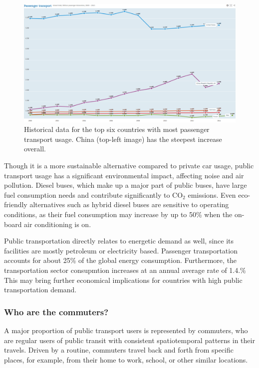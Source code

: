 \documentclass{article}
\begin{document}
\begin{figure}
  	\centering
  	\includegraphics[width=\linewidth]{./images/OECD_passengers_increase.png}
  	\caption{Historical data for the top six countries with most passenger transport usage. China (top-left image) has the steepest increase overall.}
  	\label{fig:transportation/passenger-trend}
\end{figure}

Though it is a more sustainable alternative compared to private car usage, public transport usage has a significant environmental impact, affecting noise and air pollution. Diesel buses, which make up a major part of public buses, have large fuel consumption needs and contribute significantly to CO$_{2}$ emissions. Even eco-friendly alternatives such as hybrid diesel buses are sensitive to operating conditions, as their fuel consumption may increase by up to 50\% when the on-board air conditioning is on.\cite{zhang2014real}

Public transportation directly relates to energetic demand as well, since its facilities are mostly petroleum or electricity based. Passenger transportation accounts for about 25\% of the global energy consumption. Furthermore, the transportation sector consupmtion increases at an annual average rate of 1.4.\% \cite{eia2016energy} This may bring further economical implications for countries with high public transportation demand.

\subsubsection{Who are the commuters?}
A major proportion of public transport users is represented by commuters, who are regular users of public transit with consistent spatiotemporal patterns in their travels. Driven by a routine, commuters travel back and forth from specific places, for example, from their home to work, school, or other similar locations. 
\end{document}
